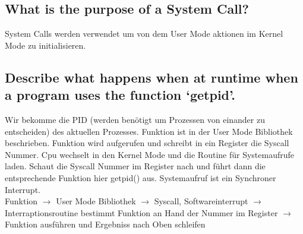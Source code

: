 %
%
%

\subsection{\important What is the purpose of a System Call?}
System Calls werden verwendet um von dem User Mode aktionen im Kernel Mode zu initialisieren.

\subsection{Describe what happens when at runtime when a program uses the function `getpid'.}
Wir bekomme die PID (werden ben\"otigt um Prozessen von einander zu entscheiden) des aktuellen Prozesses. Funktion ist in der User Mode Bibliothek beschrieben. Funktion wird aufgerufen und schreibt in ein Register die Syscall Nummer. Cpu wechselt in den Kernel Mode und die Routine f\"ur Systemaufrufe laden. Schaut die Syscall Nummer im Register nach und f\"uhrt dann die entsprechende Funktion hier getpid() aus. Systemaufruf ist ein Synchroner Interrupt.\\
Funktion $\rightarrow$ User Mode Bibliothek $\rightarrow$ Syscall, Softwareinterrupt $\rightarrow$ Interraptionsroutine bestimmt Funktion an Hand der Nummer im Register $\rightarrow$ Funktion ausf\"uhren und Ergebniss nach Oben schleifen

